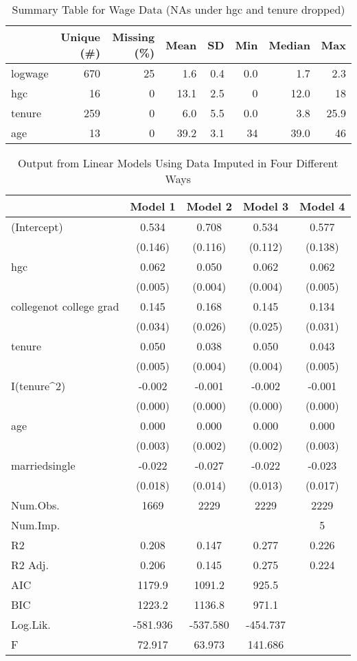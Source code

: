 \documentclass{article}
\begin{document}
\begin{table}
\centering
\begin{tabular}[t]{lrrrrrrr}
\toprule
  & Unique (\#) & Missing (\%) & Mean & SD & Min & Median & Max\\
\midrule
logwage & 670 & 25 & 1.6 & 0.4 & 0.0 & 1.7 & 2.3\\
hgc & 16 & 0 & 13.1 & 2.5 & 0 & 12.0 & 18\\
tenure & 259 & 0 & 6.0 & 5.5 & 0.0 & 3.8 & 25.9\\
age & 13 & 0 & 39.2 & 3.1 & 34 & 39.0 & 46\\
\bottomrule
\end{tabular}
\caption{\label{tab:table-name}Summary Table for Wage Data (NAs under hgc and tenure dropped)}
\end{table}

\begin{table}
\centering
\begin{tabular}[t]{lcccc}
\toprule
  & Model 1 & Model 2 & Model 3 & Model 4\\
\midrule
(Intercept) & 0.534 & 0.708 & 0.534 & 0.577\\
 & (0.146) & (0.116) & (0.112) & (0.138)\\
hgc & 0.062 & 0.050 & 0.062 & 0.062\\
 & (0.005) & (0.004) & (0.004) & \vphantom{1} (0.005)\\
collegenot college grad & 0.145 & 0.168 & 0.145 & 0.134\\
 & (0.034) & (0.026) & (0.025) & (0.031)\\
tenure & 0.050 & 0.038 & 0.050 & 0.043\\
 & (0.005) & (0.004) & (0.004) & (0.005)\\
I(tenure\textasciicircum{}2) & -0.002 & -0.001 & -0.002 & -0.001\\
 & (0.000) & (0.000) & (0.000) & (0.000)\\
age & 0.000 & 0.000 & 0.000 & 0.000\\
 & (0.003) & (0.002) & (0.002) & (0.003)\\
marriedsingle & -0.022 & -0.027 & -0.022 & -0.023\\
 & (0.018) & (0.014) & (0.013) & (0.017)\\
\midrule
Num.Obs. & 1669 & 2229 & 2229 & 2229\\
Num.Imp. &  &  &  & 5\\
R2 & 0.208 & 0.147 & 0.277 & 0.226\\
R2 Adj. & 0.206 & 0.145 & 0.275 & 0.224\\
AIC & 1179.9 & 1091.2 & 925.5 & \\
BIC & 1223.2 & 1136.8 & 971.1 & \\
Log.Lik. & -581.936 & -537.580 & -454.737 & \\
F & 72.917 & 63.973 & 141.686 & \\
\bottomrule
\end{tabular}
\caption{\label{tab:table-name}Output from Linear Models Using Data Imputed in Four Different Ways}
\end{table}
\end{document}
